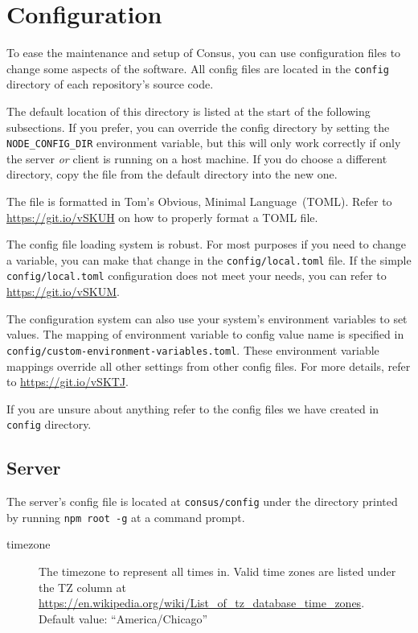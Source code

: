 \section{Configuration}
\label{sec:config}

To ease the maintenance and setup of Consus, you can use configuration files to change some aspects of the software.
All config files are located in the \texttt{config} directory of each repository's source code.

The default location of this directory is listed at the start of the following subsections.
If you prefer, you can override the config directory by setting the \texttt{NODE\_CONFIG\_DIR} environment variable, but this will only work correctly if only the server \emph{or} client is running on a host machine.
If you do choose a different directory, copy the file from the default directory into the new one.

The file is formatted in Tom's Obvious, Minimal Language~(TOML).
Refer to \url{https://git.io/vSKUH} on how to properly format a TOML file.

The config file loading system is robust.
For most purposes if you need to change a variable, you can make that change in the \texttt{config/local.toml} file.
If the simple \texttt{config/local.toml} configuration does not meet your needs, you can refer to \url{https://git.io/vSKUM}.

The configuration system can also use your system's environment variables to set values.
The mapping of environment variable to config value name is specified in \texttt{config/custom-environment-variables.toml}.
These environment variable mappings override all other settings from other config files.
For more details, refer to \url{https://git.io/vSKTJ}.

If you are unsure about anything refer to the config files we have created in \texttt{config} directory.

\subsection{Server}
\label{subsec:server_config}

The server's config file is located at \texttt{consus/config} under the directory printed by running \texttt{npm root -g} at a command prompt.

\begin{description}
  \item[timezone] The timezone to represent all times in.
    Valid time zones are listed under the TZ column at \url{https://en.wikipedia.org/wiki/List_of_tz_database_time_zones}.\\
    Default value: ``America/Chicago''
\end{description}

